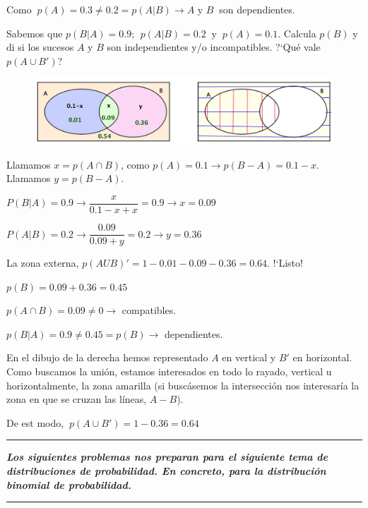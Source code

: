 Como $\ p(A)=0.3 \neq 0.2 =p(A|B) \to A\text{ y } B\ $ son dependientes.

\vspace{5mm}
\begin{ejemplo}
\begin{ejer}
Sabemos que $p(B|A)=0.9;\ \ p(A|B)=0.2 \ \text{ y } \ p(A)=0.1$. Calcula  $p(B)$ y di si los sucesos $A$ y $B$ son independientes y/o incompatibles. ?`Qué vale $p(A\cup B')$?
\end{ejer}
\end{ejemplo}

	\begin{figure}[H]
		\centering
		\includegraphics[width=1\textwidth]{imagenes/imagenes02/T02IM43.png}
	\end{figure}

Llamamos $x=p(A\cap B)$, como $p(A)=0.1\to p(B-A)=0.1-x$. Llamamos $y=p(B-A)$.

$P(B|A)=0.9 \to \dfrac{x}{0.1-x+x}=0.9 \to x=0.09$

$P(A|B)=0.2 \to \dfrac{0.09}{0.09+y}=0.2 \to y=0.36$

La zona externa, $p(AUB)'=1-0.01-0.09-0.36=0.64$. !`Listo!

$p(B)=0.09+0.36=0.45$

$p(A\cap B)=0.09\neq 0 \to $ compatibles.

$p(B|A)=0.9\neq 0.45=p(B) \to $ dependientes.

En el dibujo de la derecha hemos representado $A$ en vertical y $B'$ en horizontal. Como buscamos la unión, estamos interesados en todo lo rayado, vertical u horizontalmente, la zona amarilla (si buscásemos la intersección nos interesaría la zona en que se cruzan las líneas, $A-B$).

De est modo, $\ p(A\cup B')=1-0.36=0.64$


\vspace{1cm}
\begin{adjustwidth}{50pt}{50pt}
	\textcolor{gris}{\rule{70mm}{0.1mm}}
	
	\begin{destacado}
	\textbf{\emph{Los siguientes problemas nos preparan para el siguiente tema de distribuciones de probabilidad. En concreto, para la distribución binomial de probabilidad.}}
	\end{destacado}
	\begin{flushright}
	\rule{70mm}{0.1mm}	
	\end{flushright}
\end{adjustwidth}
\vspace{1cm}



